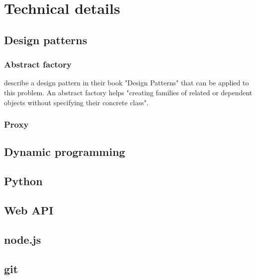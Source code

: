 
\section{Technical details}

\subsection{Design patterns}

\subsubsection{Abstract factory}
\label{sec:abstractfactory}
\citeauthor{gamma:1993} describe a design pattern in their book "Design Patterns" that can be applied to this problem.
An abstract factory helps "creating families of related or dependent objects without specifying their concrete class"\citep[p.~99]{gamma:1993}.\\

\subsubsection{Proxy}
\label{sec:proxy}

\subsection{Dynamic programming}
\label{sec:dynamic-programmming}

\subsection{Python}

\subsection{Web API}

\subsection{node.js}

\subsection{git}


